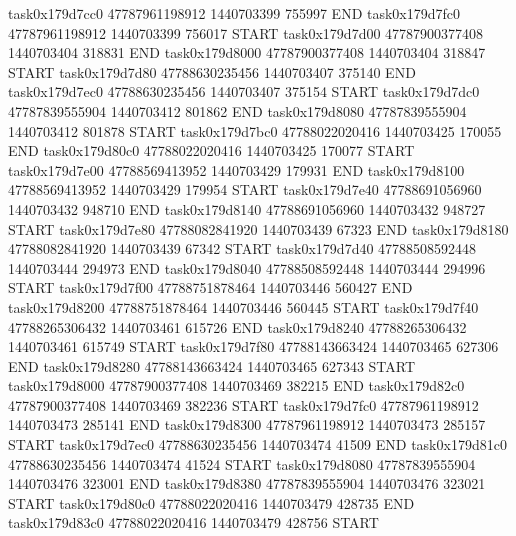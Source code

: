 task0x179d7cc0 47787961198912          1440703399               755997  END
task0x179d7fc0 47787961198912          1440703399               756017  START
task0x179d7d00 47787900377408          1440703404               318831  END
task0x179d8000 47787900377408          1440703404               318847  START
task0x179d7d80 47788630235456          1440703407               375140  END
task0x179d7ec0 47788630235456          1440703407               375154  START
task0x179d7dc0 47787839555904          1440703412               801862  END
task0x179d8080 47787839555904          1440703412               801878  START
task0x179d7bc0 47788022020416          1440703425               170055  END
task0x179d80c0 47788022020416          1440703425               170077  START
task0x179d7e00 47788569413952          1440703429               179931  END
task0x179d8100 47788569413952          1440703429               179954  START
task0x179d7e40 47788691056960          1440703432               948710  END
task0x179d8140 47788691056960          1440703432               948727  START
task0x179d7e80 47788082841920          1440703439                67323  END
task0x179d8180 47788082841920          1440703439                67342  START
task0x179d7d40 47788508592448          1440703444               294973  END
task0x179d8040 47788508592448          1440703444               294996  START
task0x179d7f00 47788751878464          1440703446               560427  END
task0x179d8200 47788751878464          1440703446               560445  START
task0x179d7f40 47788265306432          1440703461               615726  END
task0x179d8240 47788265306432          1440703461               615749  START
task0x179d7f80 47788143663424          1440703465               627306  END
task0x179d8280 47788143663424          1440703465               627343  START
task0x179d8000 47787900377408          1440703469               382215  END
task0x179d82c0 47787900377408          1440703469               382236  START
task0x179d7fc0 47787961198912          1440703473               285141  END
task0x179d8300 47787961198912          1440703473               285157  START
task0x179d7ec0 47788630235456          1440703474                41509  END
task0x179d81c0 47788630235456          1440703474                41524  START
task0x179d8080 47787839555904          1440703476               323001  END
task0x179d8380 47787839555904          1440703476               323021  START
task0x179d80c0 47788022020416          1440703479               428735  END
task0x179d83c0 47788022020416          1440703479               428756  START
